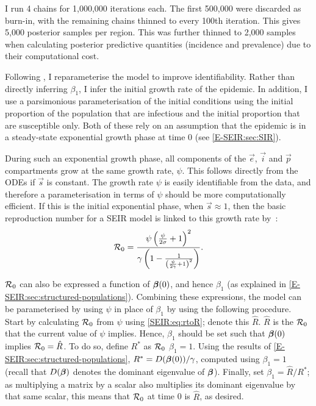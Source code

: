 \documentclass[thesis.tex]{subfiles}
\begin{document}
I run 4 chains for 1,000,000 iterations each.
The first 500,000 were discarded as burn-in, with the remaining chains thinned to every 100th iteration.
This gives 5,000 posterior samples per region.
This was further thinned to 2,000 samples when calculating posterior predictive quantities (incidence and prevalence) due to their computational cost.

Following \textcite{birrellBayesian}, I reparameterise the model to improve identifiability.
Rather than directly inferring $\beta_1$, I infer the initial growth rate of the epidemic.
In addition, I use a parsimonious parameterisation of the initial conditions using the initial proportion of the population that are infectious and the initial proportion that are susceptible only.
Both of these rely on an assumption that the epidemic is in a steady-state exponential growth phase at time 0 (see \cref{E-SEIR:sec:SIR}).

During such an exponential growth phase, all components of the $\vec{e}$, $\vec{i}$ and $\vec{p}$ compartments grow at the same growth rate, $\psi$.
This follows directly from the ODEs if $\vec{s}$ is constant. 
The growth rate $\psi$ is easily identifiable from the data, and therefore a parameterisation in terms of $\psi$ should be more computationally efficient.
If this is the initial exponential phase, when $\vec{s} \approx 1$, then the basic reproduction number for a SEIR model is linked to this growth rate by~\autocite{birrellBayesian,wearingAppropriate}:
\begin{align}
    \mathcal{R}_{0} = \frac{\psi \left( \frac{\psi}{2\sigma} + 1 \right)^2}{\gamma \left(1 - \frac{1}{\left(\frac{\psi}{2 \gamma} + 1 \right)^2} \right)} \label{SEIR:eq:rtoR}.
\end{align}

$\mathcal{R}_{0}$ can also be expressed a function of $\bm{\beta}(0)$, and hence $\beta_1$ (as explained in \cref{E-SEIR:sec:structured-populations}).
Combining these expressions, the model can be parameterised by using $\psi$ in place of $\beta_1$ by using the following procedure.
Start by calculating $\mathcal{R}_{0}$ from $\psi$ using \cref{SEIR:eq:rtoR}; denote this $\hat{R}$.
$\hat{R}$ is the $\mathcal{R}_{0}$ that the current value of $\psi$ implies.
Hence, $\beta_1$ should be set such that $\bm{\beta}(0)$ implies $\mathcal{R}_{0} = \hat{R}$.
To do so, define $R^*$ as $\mathcal{R}_{0}$ $\beta_1 = 1$.
Using the results of \cref{E-SEIR:sec:structured-populations}, $R^* = D(\bm{\beta}(0)) / \gamma$, computed using $\beta_1=1$ (recall that $D(\bm{\beta})$ denotes the dominant eigenvalue of $\bm{\beta}$).
Finally, set $\beta_1 = \hat{R} / R^*$; as multiplying a matrix by a scalar also multiplies its dominant eigenvalue by that same scalar, this means that $\mathcal{R}_{0}$ at time 0 is $\hat{R}$, as desired.
\end{document}
